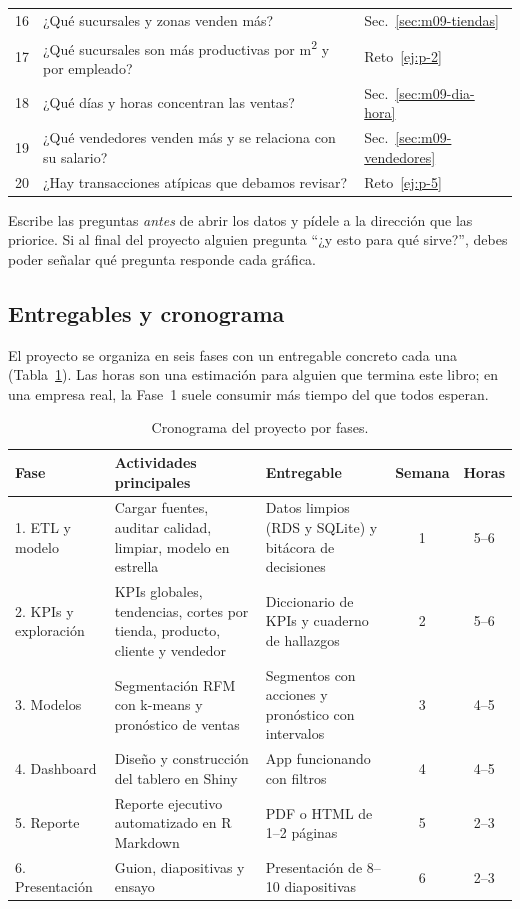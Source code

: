 \begin{table}[H]
\begin{tabularx}{\textwidth}{@{}c X l@{}}
16 & ¿Qué sucursales y zonas venden más? & Sec.~\ref{sec:m09-tiendas} \\
17 & ¿Qué sucursales son más productivas por m\textsuperscript{2} y por empleado? & Reto~\ref{ej:p-2} \\
18 & ¿Qué días y horas concentran las ventas? & Sec.~\ref{sec:m09-dia-hora} \\
19 & ¿Qué vendedores venden más y se relaciona con su salario? & Sec.~\ref{sec:m09-vendedores} \\
20 & ¿Hay transacciones atípicas que debamos revisar? & Reto~\ref{ej:p-5} \\
\bottomrule
\end{tabularx}
\end{table}

\begin{consejo}
Escribe las preguntas \emph{antes} de abrir los datos y pídele a la dirección
que las priorice. Si al final del proyecto alguien pregunta ``¿y esto para
qué sirve?'', debes poder señalar qué pregunta responde cada gráfica.
\end{consejo}

\subsection{Entregables y cronograma}

El proyecto se organiza en seis fases con un entregable concreto cada una
(Tabla~\ref{tab:m09-cronograma}). Las horas son una estimación para alguien
que termina este libro; en una empresa real, la Fase~1 suele consumir
más tiempo del que todos esperan.

\begin{table}[H]
\centering
\small
\caption{Cronograma del proyecto por fases.}
\label{tab:m09-cronograma}
\begin{tabularx}{\textwidth}{@{}l X X c c@{}}
\toprule
Fase & Actividades principales & Entregable & Semana & Horas \\
\midrule
1. ETL y modelo & Cargar fuentes, auditar calidad, limpiar, modelo en estrella & Datos limpios (RDS y SQLite) y bitácora de decisiones & 1 & 5--6 \\
2. KPIs y exploración & KPIs globales, tendencias, cortes por tienda, producto, cliente y vendedor & Diccionario de KPIs y cuaderno de hallazgos & 2 & 5--6 \\
3. Modelos & Segmentación RFM con k-means y pronóstico de ventas & Segmentos con acciones y pronóstico con intervalos & 3 & 4--5 \\
4. Dashboard & Diseño y construcción del tablero en Shiny & App funcionando con filtros & 4 & 4--5 \\
5. Reporte & Reporte ejecutivo automatizado en R Markdown & PDF o HTML de 1--2 páginas & 5 & 2--3 \\
6. Presentación & Guion, diapositivas y ensayo & Presentación de 8--10 diapositivas & 6 & 2--3 \\
\bottomrule
\end{tabularx}
\end{table}

